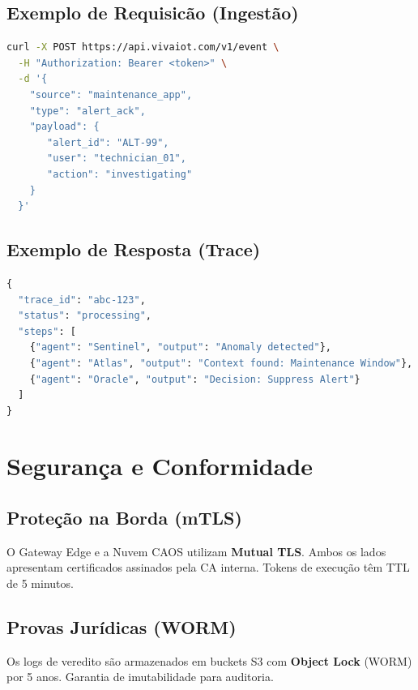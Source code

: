 \documentclass[12pt, a4paper]{article}
\begin{document}
\subsection{Exemplo de Requisicão (Ingestão)}
\begin{lstlisting}[language=bash]
curl -X POST https://api.vivaiot.com/v1/event \
  -H "Authorization: Bearer <token>" \
  -d '{
    "source": "maintenance_app",
    "type": "alert_ack",
    "payload": {
       "alert_id": "ALT-99",
       "user": "technician_01",
       "action": "investigating"
    }
  }'
\end{lstlisting}

\subsection{Exemplo de Resposta (Trace)}
\begin{lstlisting}[language=Python]
{
  "trace_id": "abc-123",
  "status": "processing",
  "steps": [
    {"agent": "Sentinel", "output": "Anomaly detected"},
    {"agent": "Atlas", "output": "Context found: Maintenance Window"},
    {"agent": "Oracle", "output": "Decision: Suppress Alert"}
  ]
}
\end{lstlisting}

\newpage

\section{Segurança e Conformidade}
\label{sec:security}

\subsection{Proteção na Borda (mTLS)}
O Gateway Edge e a Nuvem CAOS utilizam \textbf{Mutual TLS}. Ambos os lados apresentam certificados assinados pela CA interna. Tokens de execução têm TTL de 5 minutos.

\subsection{Provas Jurídicas (WORM)}
Os logs de veredito são armazenados em buckets S3 com \textbf{Object Lock} (WORM) por 5 anos. Garantia de imutabilidade para auditoria.

\newpage
\end{document}
